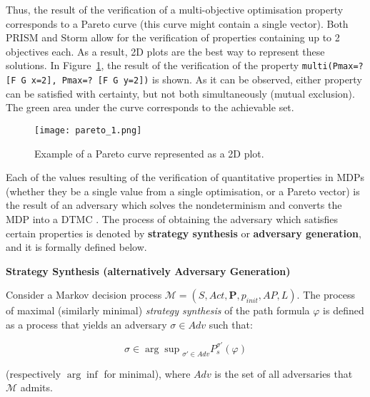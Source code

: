 Thus, the result of the verification of a multi-objective optimisation property corresponds to a Pareto curve (this curve might contain a single vector). Both PRISM and Storm allow for the verification of properties containing up to 2 objectives each. As a result, 2D plots are the best way to represent these solutions. In Figure~\ref{fig:pareto_1}, the result of the verification of the property \texttt{multi(Pmax=? [F G x=2], Pmax=? [F G y=2])} is shown. As it can be observed, either property can be satisfied with certainty, but not both simultaneously (mutual exclusion). The green area under the curve corresponds to the achievable set.

\begin{figure}[h]
    \centering
    \texttt{[image: pareto\_1.png]}
    \caption{Example of a Pareto curve represented as a 2D plot.}
    \label{fig:pareto_1}
\end{figure}

Each of the values resulting of the verification of quantitative properties in MDPs (whether they be a single value from a single optimisation, or a Pareto vector) is the result of an adversary which solves the nondeterminism and converts the MDP into a DTMC \cite{bk08}. The process of obtaining the adversary which satisfies certain properties is denoted by \textbf{strategy synthesis} or \textbf{adversary generation}, and it is formally defined below.

{\begin{defi}
{\setlength{\parskip}{2em}
\textbf{Strategy Synthesis (alternatively Adversary Generation)}\vspace{1em}\\}
{\setlength{\parskip}{1em} 

Consider a Markov decision process $\mathcal{M} = (S, Act, \mathbf{P}, p_{init}, AP, L)$. The process of maximal (similarly minimal) \textit{strategy synthesis} of the path formula $\varphi$ is defined as a process that yields an adversary $\sigma \in Adv$ such that:

\begin{equation}
	\sigma \in {\arg\sup}_{\sigma' \in Adv} P^{\sigma'}_s (\varphi)
\end{equation}

(respectively $\arg\inf$ for minimal), where $Adv$ is the set of all adversaries that $\mathcal{M}$ admits.

}
\end{defi}}

